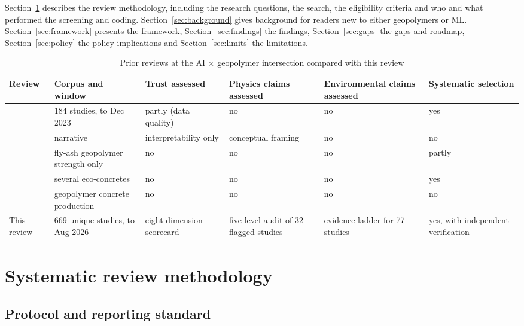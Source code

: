 \documentclass[pdflatex,sn-basic]{sn-jnl}
\begin{document}
Section~\ref{sec:methods} describes the review methodology, including the research questions, the search, the eligibility criteria and who and what performed the screening and coding. Section~\ref{sec:background} gives background for readers new to either geopolymers or ML. Section~\ref{sec:framework} presents the framework, Section~\ref{sec:findings} the findings, Section~\ref{sec:gaps} the gaps and roadmap, Section~\ref{sec:policy} the policy implications and Section~\ref{sec:limits} the limitations.

\begin{table}[htbp]
\caption{Prior reviews at the AI $\times$ geopolymer intersection compared with this review}\label{tab:prior}
\centering
{\footnotesize
\begin{tabular}{p{}p{}p{}p{}p{}p{}}
\toprule
Review & Corpus and window & Trust assessed & Physics claims assessed & Environmental claims assessed & Systematic selection \\
\midrule
\citet{nguyen2025} & 184 studies, to Dec 2023 & partly (data quality) & no & no & yes \\
\citet{zheng2025} & narrative & interpretability only & conceptual framing & no & no \\
\citet{rathnayaka2024} & fly-ash geopolymer strength only & no & no & no & partly \\
\citet{ali2024} & several eco-concretes & no & no & no & yes \\
\citet{alaneme2023} & geopolymer concrete production & no & no & no & no \\
This review & 669 unique studies, to Aug 2026 & eight-dimension scorecard & five-level audit of 32 flagged studies & evidence ladder for 77 studies & yes, with independent verification \\
\bottomrule
\end{tabular}}
\end{table}

\section{Systematic review methodology}\label{sec:methods}

\subsection{Protocol and reporting standard}\label{sec:protocol}\label{sec:dup}
\end{document}
